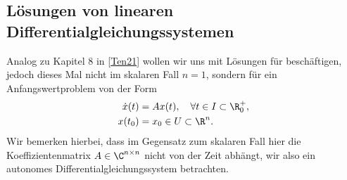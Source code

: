 \documentclass[letterpaper,10pt,german]{jupyterBook}
\begin{document}
\subsection{Lösungen von linearen Differentialgleichungssystemen}
\label{\detokenize{ode/repetition:losungen-von-linearen-differentialgleichungssystemen}}\label{\detokenize{ode/repetition:s-lineare-dglsysteme}}
\sphinxAtStartPar
Analog zu Kapitel 8 in {[}\hyperlink{cite.references:id15}{Ten21}{]} wollen wir uns mit Lösungen für  beschäftigen, jedoch dieses Mal nicht im skalaren Fall \(n=1\), sondern für ein Anfangswertproblem von der Form
\begin{equation}\label{equation:ode/repetition:eq:linhomdglsystem}
\begin{split}\dot{x}(t) &= A x(t), \quad \forall t \in I \subset \R^+_0, \\
x(t_0) &= x_0 \in U \subset \R^n.\end{split}
\end{equation}
\sphinxAtStartPar
Wir bemerken hierbei, dass im Gegensatz zum skalaren Fall hier die Koeffizientenmatrix \(A \in \C^{n\times n}\) nicht von der Zeit abhängt, wir also ein autonomes Differentialgleichungssystem betrachten.
\end{document}
